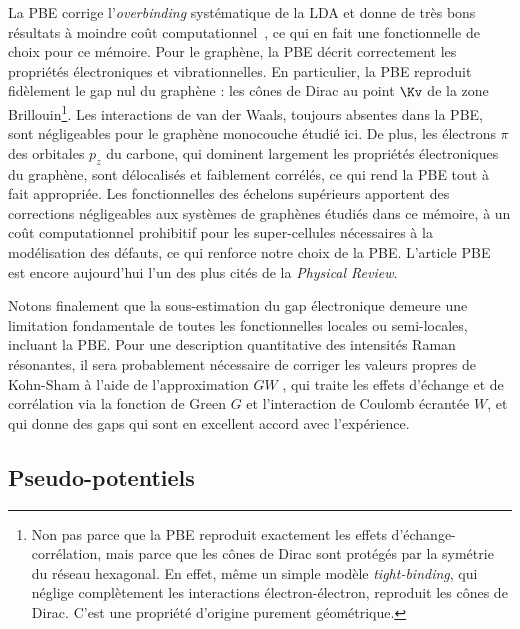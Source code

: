 La PBE corrige l'\textit{overbinding} systématique de la LDA et donne de très bons résultats à moindre coût computationnel~\cite{kurthMolecularSolidstateTests1999,mounetFirstprinciplesDeterminationStructural2005a}, ce qui en fait une fonctionnelle de choix pour ce mémoire. Pour le graphène, la PBE décrit correctement les propriétés électroniques et vibrationnelles. En particulier, la PBE reproduit fidèlement le gap nul du graphène : les cônes de Dirac au point $\Kv$ de la zone Brillouin\footnote{Non pas parce que la PBE reproduit exactement les effets d'échange-corrélation, mais parce que les cônes de Dirac sont protégés par la symétrie du réseau hexagonal. En effet, même un simple modèle \textit{tight-binding}, qui néglige complètement les interactions électron-électron, reproduit les cônes de Dirac. C'est une propriété d'origine purement géométrique.}. Les interactions de van der Waals, toujours absentes dans la PBE, sont négligeables pour le graphène monocouche étudié ici. De plus, les électrons $\pi$ des orbitales $p_z$ du carbone, qui dominent largement les propriétés électroniques du graphène, sont délocalisés et faiblement corrélés, ce qui rend la PBE tout à fait appropriée.  Les fonctionnelles des échelons supérieurs apportent des corrections négligeables aux systèmes de graphènes étudiés dans ce mémoire, à un coût computationnel prohibitif pour les super-cellules nécessaires à la modélisation des défauts, ce qui renforce notre choix de la PBE. L'article PBE \cite{perdewGeneralizedGradientApproximation1996a} est encore aujourd'hui l'un des plus cités de la \textit{Physical Review}.

Notons finalement que la sous-estimation du gap électronique demeure une limitation fondamentale de toutes les fonctionnelles locales ou semi-locales, incluant la PBE. Pour une description quantitative des intensités Raman résonantes, il sera probablement nécessaire de corriger les valeurs propres de Kohn-Sham à l'aide de l'approximation $GW$ \cite{hedinNewMethodCalculating1965,hybertsenElectronCorrelationSemiconductors1986}, qui traite les effets d'échange et de corrélation via la fonction de Green $G$ et l'interaction de Coulomb écrantée $W$, et qui donne des gaps qui sont en excellent accord avec l'expérience.

\subsection{Pseudo-potentiels}\label{sec:PP}

